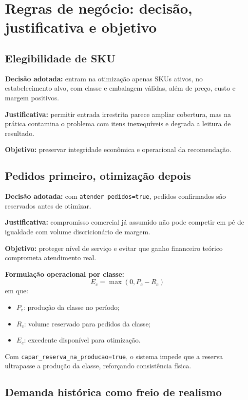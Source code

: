 \documentclass[11pt,a4paper]{article}
\begin{document}
\section{Regras de negócio: decisão, justificativa e objetivo}

\subsection{Elegibilidade de SKU}

\textbf{Decisão adotada:} entram na otimização apenas SKUs ativos, no
estabelecimento alvo, com classe e embalagem válidas, além de preço, custo e
margem positivos.

\textbf{Justificativa:} permitir entrada irrestrita parece ampliar cobertura, mas
na prática contamina o problema com itens inexequíveis e degrada a leitura de
resultado.

\textbf{Objetivo:} preservar integridade econômica e operacional da recomendação.

\subsection{Pedidos primeiro, otimização depois}

\textbf{Decisão adotada:} com \texttt{atender\_pedidos=true}, pedidos
confirmados são reservados antes de otimizar.

\textbf{Justificativa:} compromisso comercial já assumido não pode competir em
pé de igualdade com volume discricionário de margem.

\textbf{Objetivo:} proteger nível de serviço e evitar que ganho financeiro
teórico comprometa atendimento real.

\textbf{Formulação operacional por classe:}
\[
E_c = \max(0, P_c - R_c)
\]
em que:
\begin{itemize}[leftmargin=1.2cm]
    \item \(P_c\): produção da classe no período;
    \item \(R_c\): volume reservado para pedidos da classe;
    \item \(E_c\): excedente disponível para otimização.
\end{itemize}

Com \texttt{capar\_reserva\_na\_producao=true}, o sistema impede que a reserva
ultrapasse a produção da classe, reforçando consistência física.

\subsection{Demanda histórica como freio de realismo}
\end{document}
